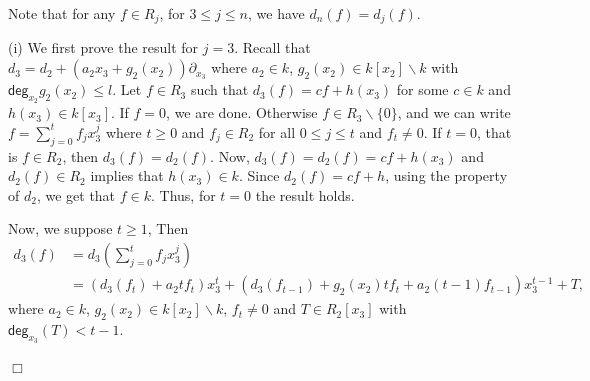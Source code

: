 \documentclass[12pt,reqno]{amsart}
\renewcommand{\deg}{\mathsf{deg}}
\renewcommand{\setminus}{\smallsetminus}
\renewcommand{\leq}{\leqslant}
\renewcommand{\geq}{\geqslant}
\numberwithin{thm}{section}
\theoremstyle{definition}
\numberwithin{equation}{thm}
\renewenvironment{proof}{\par\noindent {\em Proof:}}{\hfill$\Box$\medskip}
\theoremstyle{plain}
\begin{document}
\begin{proof} Note that for any $f\in R_j$, for $3\leq j\leq n$, we have $d_n(f)=d_j(f)$.
	
	(i) We first prove the result for $j=3$. Recall that $d_{3}=d_2+(a_2x_{3}+g_2(x_2))\partial_{x_3}$ where $a_2\in k$, $g_2(x_2)\in k[x_2]\setminus k$ with $\deg_{x_2}g_2(x_2)\leq l$. Let $f\in R_{3}$ such that $d_{3}(f)=cf+h(x_{3})$ for some $c \in k$ and $h(x_{3})\in k[x_{3}]$.  If $f=0$, we are done. Otherwise $f\in R_{3}\backslash\{0\}$, and we can write $f=\sum_{j=0}^{t}f_jx_{3}^j$ where $t\geq 0$ and $f_j\in R_2$ for all $0\leq j\leq t$ and $f_t\neq 0$.
	If $t=0$, that is $f\in R_{2}$, then $d_{3}(f)=d_{2}(f)$. Now, $d_{3}(f)=d_{2}(f)=cf+h(x_{3})$ and $d_2(f)\in R_2$ implies that $h(x_{3})\in k$. Since $d_{2}(f)=cf+h$, using the property of $d_2$, we get that $f\in k$. Thus, for $t=0$ the result holds.
    
	Now, we suppose $t\geq 1$, Then
	\begin{align}\label{onlyeqn}
		d_{3}(f)&=d_{3}(\sum_{j=0}^{t}f_jx_{3}^j)\\ 
		&=(d_{3}(f_t)+a_2tf_t)x_{3}^t+(d_{3}(f_{t-1})+g_2(x_2)tf_t+a_2(t-1)f_{t-1})x_{3}^{t-1}+ T, \nonumber
	\end{align} 
	where $a_2\in k$, $g_2(x_2)\in k[x_2]\setminus k$, $f_t\neq 0$ and $T \in R_{2}[x_{3}]$ with $\deg_{x_{3}}(T) <t-1$.
	

\end{proof}
\end{document}
